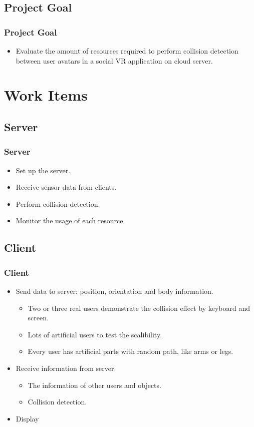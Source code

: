 \documentclass{beamer}
\begin{document}
\subsection{Project Goal}
	\begin{frame}
	\frametitle{Project Goal}
	\begin{itemize}
		\item Evaluate the amount of resources required to perform collision detection between user avatars in a social VR application on cloud server.
	\end{itemize}
	\end{frame}

\section{Work Items}

\subsection{Server}
	\begin{frame}
	\frametitle{Server}
	\begin{itemize}
		\item Set up the server.
		\item Receive sensor data from clients.
		\item Perform collision detection.
		\item Monitor the usage of each resource.
	\end{itemize}
	\end{frame}

\subsection{Client}
	\begin{frame}
	\frametitle{Client}
	\begin{itemize}
		\item Send data to server: position, orientation and body information.
			\begin{itemize}
				\item Two or three real users demonstrate the collision effect by keyboard and screen.
				\item Lots of artificial users to test the scalibility.
				\item Every user has artificial parts with random path, like arms or legs.
			\end{itemize}
		\item Receive information from server.
			\begin{itemize}
				\item The information of other users and objects.
				\item Collision detection.
			\end{itemize}
		\item Display
	\end{itemize}
	\end{frame}
\end{document}
